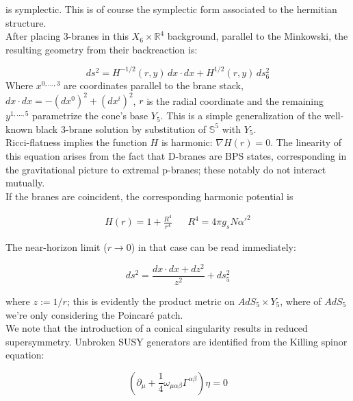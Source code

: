 is symplectic. This is of course the symplectic form associated to the hermitian structure.\\

After placing 3-branes in this $X_6 \times \mathbb{R}^4$ background, parallel to the Minkowski, the resulting geometry from their backreaction is:

\begin{equation}
ds^2 = H^{-1/2}(r,y) \, dx\cdot dx + H^{1/2}(r,y) \, ds_6^2
\end{equation}
Where $x^{0,\ldots,3}$ are coordinates parallel to the brane stack, $dx\cdot dx = -(dx^0)^2 + (dx^i)^2$, $r$ is the radial coordinate and the remaining $y^{1,\ldots,5}$ parametrize the cone's base $Y_5$. This is a simple generalization of the well-known black 3-brane solution by substitution of $\mathbb{S}^5$ with $Y_5$.\\

Ricci-flatness implies the function $H$ is harmonic: $\nabla H(r) = 0$. The linearity of this equation arises from the fact that D-branes are BPS states, corresponding in the gravitational picture to extremal p-branes; these notably do not interact mutually.\\

If the branes are coincident, the corresponding harmonic potential is

\begin{align}
 H(r) = 1 + \frac{R^4}{r^4} && R^4 = 4 \pi g_s N \alpha'^2 
\end{align}

The near-horizon limit ($r\rightarrow 0$) in that case can be read immediately:

\begin{equation}
ds^2 = \frac{ dx \cdot dx + dz^2}{z^2} + ds_5^2
\end{equation}

where $z := 1/r$; this is evidently the product metric on $AdS_5 \times Y_5$, where of $AdS_5$ we're only considering the Poincaré patch. \\

We note that the introduction of a conical singularity results in reduced supersymmetry. Unbroken SUSY generators are identified from the Killing spinor equation:

\begin{equation}
	\left(\partial_\mu + \frac{1}{4} \omega_{\mu\alpha\beta} \Gamma^{\alpha\beta} \right) \eta = 0
\end{equation}

